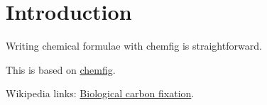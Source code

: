 \documentclass{article}
\begin{document}
\section{Introduction}
Writing chemical formulae with chemfig is straightforward.

This is based on \href{https://www.overleaf.com/learn/latex/Chemistry_formulae}{chemfig}.

Wikipedia links:
\href{https://en.wikipedia.org/wiki/Biological_carbon_fixation}{Biological carbon fixation}.

\end{document}
